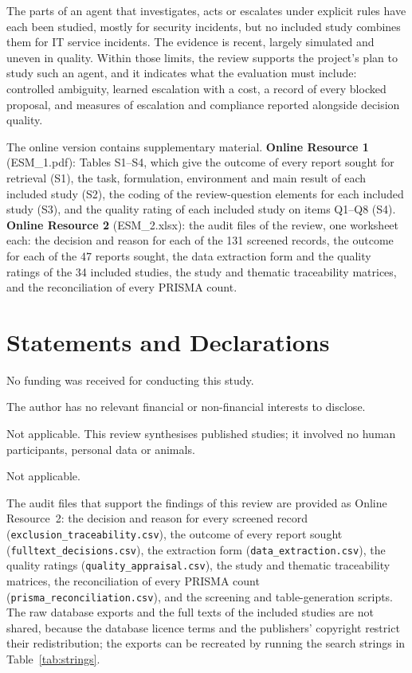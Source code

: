 \documentclass[pdflatex,sn-basic]{sn-jnl}
\begin{document}
The parts of an agent that investigates, acts or escalates under explicit rules have each been studied, mostly for security incidents, but no included study combines them for IT service incidents. The evidence is recent, largely simulated and uneven in quality. Within those limits, the review supports the project's plan to study such an agent, and it indicates what the evaluation must include: controlled ambiguity, learned escalation with a cost, a record of every blocked proposal, and measures of escalation and compliance reported alongside decision quality.

\backmatter

The online version contains supplementary material.
\textbf{Online Resource 1} (ESM\_1.pdf): Tables S1--S4, which give the outcome of every report sought for retrieval (S1), the task, formulation, environment and main result of each included study (S2), the coding of the review-question elements for each included study (S3), and the quality rating of each included study on items Q1--Q8 (S4).
\textbf{Online Resource 2} (ESM\_2.xlsx): the audit files of the review, one worksheet each: the decision and reason for each of the 131 screened records, the outcome for each of the 47 reports sought, the data extraction form and the quality ratings of the 34 included studies, the study and thematic traceability matrices, and the reconciliation of every PRISMA count.

\section*{Statements and Declarations}

No funding was received for conducting this study.

The author has no relevant financial or non-financial interests to disclose.

Not applicable. This review synthesises published studies; it involved no human participants, personal data or animals.

Not applicable.

The audit files that support the findings of this review are provided as Online Resource~2: the decision and reason for every screened record (\texttt{exclusion\_traceability.csv}), the outcome of every report sought (\texttt{fulltext\_decisions.csv}), the extraction form (\texttt{data\_extraction.csv}), the quality ratings (\texttt{quality\_appraisal.csv}), the study and thematic traceability matrices, the reconciliation of every PRISMA count (\texttt{prisma\_reconciliation.csv}), and the screening and table-generation scripts. The raw database exports and the full texts of the included studies are not shared, because the database licence terms and the publishers' copyright restrict their redistribution; the exports can be recreated by running the search strings in Table~\ref{tab:strings}.
\end{document}
